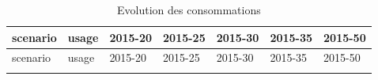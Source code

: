 \documentclass[]{article}
\begin{document}
\begin{longtable}[]{@{}lllllll@{}}
\caption{Evolution des consommations}\tabularnewline
\toprule
\begin{minipage}[b]{0.14\columnwidth}\raggedright\strut
scenario\strut
\end{minipage} & \begin{minipage}[b]{0.13\columnwidth}\raggedright\strut
usage\strut
\end{minipage} & \begin{minipage}[b]{0.11\columnwidth}\raggedright\strut
2015-20\strut
\end{minipage} & \begin{minipage}[b]{0.11\columnwidth}\raggedright\strut
2015-25\strut
\end{minipage} & \begin{minipage}[b]{0.11\columnwidth}\raggedright\strut
2015-30\strut
\end{minipage} & \begin{minipage}[b]{0.11\columnwidth}\raggedright\strut
2015-35\strut
\end{minipage} & \begin{minipage}[b]{0.11\columnwidth}\raggedright\strut
2015-50\strut
\end{minipage}\tabularnewline
\midrule
\endfirsthead
\toprule
\begin{minipage}[b]{0.14\columnwidth}\raggedright\strut
scenario\strut
\end{minipage} & \begin{minipage}[b]{0.13\columnwidth}\raggedright\strut
usage\strut
\end{minipage} & \begin{minipage}[b]{0.11\columnwidth}\raggedright\strut
2015-20\strut
\end{minipage} & \begin{minipage}[b]{0.11\columnwidth}\raggedright\strut
2015-25\strut
\end{minipage} & \begin{minipage}[b]{0.11\columnwidth}\raggedright\strut
2015-30\strut
\end{minipage} & \begin{minipage}[b]{0.11\columnwidth}\raggedright\strut
2015-35\strut
\end{minipage} & \begin{minipage}[b]{0.11\columnwidth}\raggedright\strut
2015-50\strut
\end{minipage}\tabularnewline
\midrule
\endhead
\begin{minipage}[t]{0.14\columnwidth}\raggedright\strut

\end{minipage}
\end{longtable}
\end{document}

